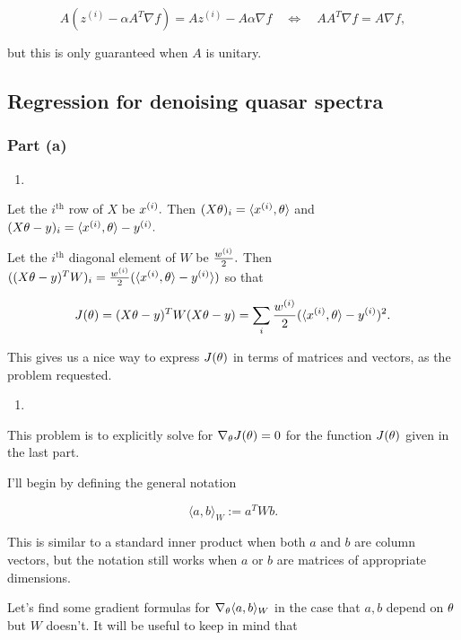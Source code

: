 \documentclass[]{article}
\begin{document}
\[A(z^{(i)} - \alpha A^T\nabla f) = Az^{(i)} - A\alpha\nabla f
\quad\Leftrightarrow\quad
AA^T\nabla f = A\nabla f,\]

but this is only guaranteed when \(A\) is unitary.

\subsection{Regression for denoising quasar
spectra}\label{regression-for-denoising-quasar-spectra}

\subsubsection{Part (a)}\label{part-a-4}

\begin{enumerate}
\def\labelenumi{\roman{enumi}.}
\item
\end{enumerate}

\newcommand{\up}[1]{^\text{#1}}

Let the \(i\up{th}\) row of \(X\) be \(x^{(i)}.\) Then
\((X\theta)_i = \langle x^{(i)},\theta\rangle\) and
\((X\theta - y)_i = \langle x^{(i)}, \theta\rangle - y^{(i)}.\)

Let the \(i\up{th}\) diagonal element of \(W\) be \(\frac{w^{(i)}}{2}.\)
Then
\(((X\theta-y)^T W)_i = \frac{w^{(i)}}{2}(\langle x^{(i)},\theta\rangle-y^{(i)}\rangle)\)
so that

\[J(\theta) = (X\theta - y)^T W (X\theta - y) =
  \sum_i \frac{w^{(i)}}{2}(\langle x^{(i)},\theta\rangle - y^{(i)})^2.\]

This gives us a nice way to express \(J(\theta)\) in terms of matrices and
vectors, as the problem requested.

\begin{enumerate}
\def\labelenumi{\roman{enumi}.}
\setcounter{enumi}{1}
\item
\end{enumerate}

This problem is to explicitly solve for \(\nabla_\theta J(\theta) = 0\) for
the function \(J(\theta)\) given in the last part.

I'll begin by defining the general notation

\[\langle a, b \rangle_W := a^T W b.\]

This is similar to a standard inner product when both \(a\) and \(b\)
are column vectors, but the notation still works when \(a\) or \(b\) are
matrices of appropriate dimensions.

Let's find some gradient formulas for
\(\nabla_\theta \langle a, b\rangle_W\) in the case that \(a, b\) depend on
\(\theta\) but \(W\) doesn't. It will be useful to keep in mind that
\end{document}
